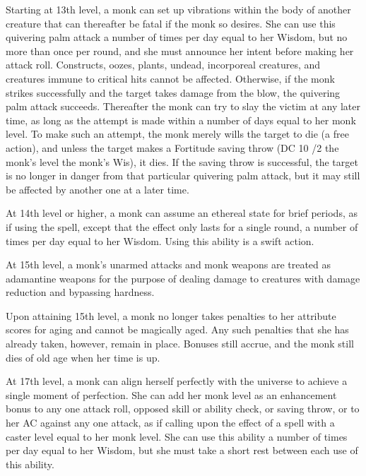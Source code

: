  Starting at 13th level, a monk can set up vibrations within the body of another creature that can thereafter be fatal if the monk so desires. She can use this quivering palm attack a number of times per day equal to her Wisdom, but no more than once per round, and she must announce her intent before making her attack roll. Constructs, oozes, plants, undead, incorporeal creatures, and creatures immune to critical hits cannot be affected. Otherwise, if the monk strikes successfully and the target takes damage from the blow, the quivering palm attack succeeds. Thereafter the monk can try to slay the victim at any later time, as long as the attempt is made within a number of days equal to her monk level. To make such an attempt, the monk merely wills the target to die (a free action), and unless the target makes a Fortitude saving throw (DC 10 /2 the monk's level \add the monk's Wis), it dies. If the saving throw is successful, the target is no longer in danger from that particular quivering palm attack, but it may still be affected by another one at a later time.

 At 14th level or higher, a monk can assume an ethereal state for brief periods, as if using the  spell, except that the effect only lasts for a single round, a number of times per day equal to her Wisdom. Using this ability is a swift action.

 At 15th level, a monk's unarmed attacks and monk weapons are treated as adamantine weapons for the purpose of dealing damage to creatures with damage reduction and bypassing hardness.

 Upon attaining 15th level, a monk no longer takes penalties to her attribute scores for aging and cannot be magically aged. Any such penalties that she has already taken, however, remain in place. Bonuses still accrue, and the monk still dies of old age when her time is up.

 At 17th level, a monk can align herself perfectly with the universe to achieve a single moment of perfection. She can add her monk level as an enhancement bonus to any one attack roll, opposed skill or ability check, or saving throw, or to her AC against any one attack, as if calling upon the effect of a  spell with a caster level equal to her monk level. She can use this ability a number of times per day equal to her Wisdom, but she must take a short rest between each use of this ability.

